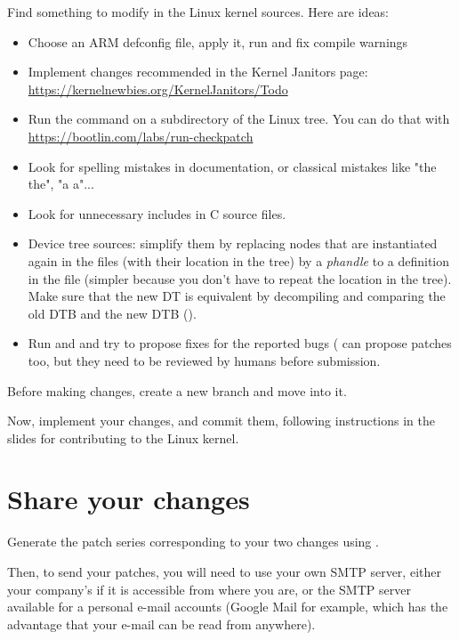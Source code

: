 Find something to modify in the Linux kernel sources. Here are ideas:

\begin{itemize}
\item Choose an ARM defconfig file, apply it, run  and fix compile warnings
\item Implement changes recommended in the Kernel Janitors page:
      \url{https://kernelnewbies.org/KernelJanitors/Todo}
\item Run the  command on a subdirectory of the Linux tree.
      You can do that with \url{https://bootlin.com/labs/run-checkpatch}
\item Look for spelling mistakes in documentation, or classical mistakes like "the the", "a a"...
\item Look for unnecessary includes in C source files.
\item Device tree sources: simplify them by replacing nodes that are
      instantiated again in the  files (with their location
      in the tree) by a {\em phandle} to a definition in the  file
      (simpler because you don't have to repeat the location in the tree).
      Make sure that the new DT is equivalent by decompiling and comparing the old DTB
      and the new DTB ().
\item Run  and 
      and try to propose fixes for the reported bugs (
      can propose patches too, but they need to be reviewed by humans
      before submission.

\end{itemize}

Before making changes, create a new branch and move into it.

Now, implement your changes, and commit them, following instructions
in the slides for contributing to the Linux kernel.

\section{Share your changes}

Generate the patch series corresponding to your two changes using
.

Then, to send your patches, you will need to use your own SMTP server, either your company's
if it is accessible from where you are, or the SMTP server available for a personal e-mail
accounts (Google Mail for example, which has the advantage that your e-mail can be read
from anywhere).

